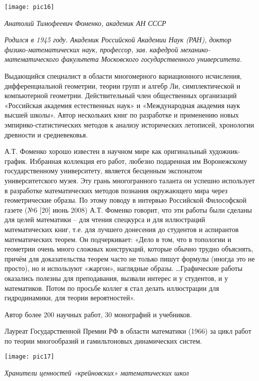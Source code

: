\begin{center}

\texttt{[image: pic16]}


{\it Анатолий Тимофеевич Фоменко, академик АН СССР}
\end{center}

{\it Родился в 1945 году. Академик Российской Академии Наук (РАН), доктор физико-математических наук, профессор, зав. кафедрой механико-математического факультета Московского государственного университета.

Выдающийся специалист в области многомерного вариационного исчисления, дифференциальной геометрии, теории групп и алгебр Ли, симплектической и компьютерной геометрии. Действительный член общественных организаций «Российская академия естественных наук» и «Международная академия наук высшей школы». Автор нескольких книг по разработке и применению новых эмпирико-статистических методов к анализу исторических летописей, хронологии древности и средневековья.

А.Т. Фоменко хорошо известен в научном мире как оригинальный художник-график. Избранная коллекция его работ, любезно подаренная им Воронежскому государственному университету, является бесценным экспонатом университетского музея. Эту грань многогранного таланта он успешно использует в разработке математических методов познания окружающего мира через геометрические образы. По этому поводу в интервью Российской Философской газете (№6 [20] июнь 2008) А.Т. Фоменко говорит, что эти работы были сделаны для целей математики – для чтения спецкурса и для иллюстраций математических книг, т.е. для лучшего донесения до студентов и аспирантов математических теорем.  Он подчеркивает: «Дело в том, что в топологии и геометрии очень много сложных конструкций, которые обычно трудно объяснять, причём для доказательства теорем часто не только пишут формулы (иногда это не просто), но и используют «жаргон», наглядные образы. …Графические работы оказались полезны для преподавания, вызвали интерес и у студентов, и у математиков. Потом по просьбе коллег я стал делать иллюстрации для гидродинамики, для теории вероятностей».

Автор более 200 научных работ, 30 монографий и учебников.

Лауреат Государственной Премии РФ в области математики (1966) за цикл работ по теории многообразий и гамильтоновых динамических систем.}


\begin{center}

\texttt{[image: pic17]}


{\it Хранители ценностей
«крейновских» математических школ
}
\end{center}

